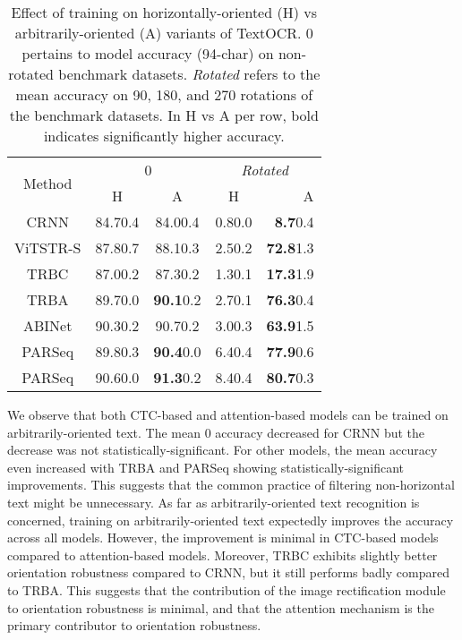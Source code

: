 \begin{table}[htbp]
  \centering
  \scriptsize
  \setlength{\tabcolsep}{10pt}
  \caption{Effect of training on horizontally-oriented (H) vs arbitrarily-oriented (A) variants of TextOCR. 0\textdegree{} pertains to model accuracy (94-char) on non-rotated benchmark datasets. \textit{Rotated} refers to the mean accuracy on 90\textdegree, 180\textdegree, and 270\textdegree{} rotations of the benchmark datasets. In H vs A per row, bold indicates significantly higher accuracy.}
  \begin{tabular}{ c | c c | c r }
    \toprule
    \multirow{2}{*}{Method} & \multicolumn{2}{c|}{0\textdegree{}} & \multicolumn{2}{c}{\textit{Rotated}} \\
    & H & A & H & A\hspace{14pt} \\
    \midrule
    CRNN & 84.70.4 & 84.00.4 & 0.80.0 & \textbf{8.7}0.4 \\
    ViTSTR-S & 87.80.7 & 88.10.3 & 2.50.2 & \textbf{72.8}1.3 \\
    TRBC & 87.00.2 & 87.30.2 & 1.30.1 & \textbf{17.3}1.9 \\
    TRBA & 89.70.0 & \textbf{90.1}0.2 & 2.70.1 & \textbf{76.3}0.4 \\
    ABINet & 90.30.2 & 90.70.2 & 3.00.3 & \textbf{63.9}1.5 \\
    \midrule
    PARSeq & 89.80.3 & \textbf{90.4}0.0 & 6.40.4 & \textbf{77.9}0.6 \\
    PARSeq & 90.60.0 & \textbf{91.3}0.2 & 8.40.4 & \textbf{80.7}0.3 \\
    \bottomrule
  \end{tabular}
  \label{tab:horizontal-vs-arbitrary}
\end{table}

We observe that both CTC-based and attention-based models can be trained on arbitrarily-oriented text. The mean 0\textdegree{} accuracy decreased for CRNN but the decrease was not statistically-significant. For other models, the mean accuracy even increased with TRBA and PARSeq showing statistically-significant improvements. This suggests that the common practice of filtering non-horizontal text might be unnecessary. As far as arbitrarily-oriented text recognition is concerned, training on arbitrarily-oriented text expectedly improves the accuracy across all models. However, the improvement is minimal in CTC-based models compared to attention-based models. Moreover, TRBC exhibits slightly better orientation robustness compared to CRNN, but it still performs badly compared to TRBA. This suggests that the contribution of the image rectification module to orientation robustness is minimal, and that the attention mechanism is the primary contributor to orientation robustness.


